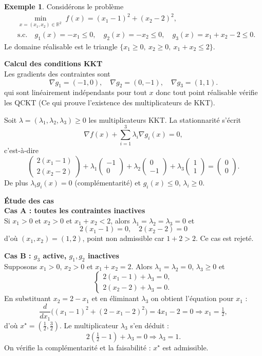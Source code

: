 \documentclass[a4paper,12pt,openany]{book}
\theoremstyle{plain}
\theoremstyle{definition}
\newtheorem{example}[theorem]{Exemple}
\theoremstyle{remark}
\theoremstyle{nbstyle}
\begin{document}
	\begin{example}
		Considérons le problème
		\[\begin{aligned}
		&\displaystyle\min_{x=(x_1,x_2)\in\mathbb{R}^2}\; f(x)=(x_1-1)^2+(x_2-2)^2,\\[4pt]
		&\text{s.c.}\quad g_1(x)=-x_1\le0,\quad g_2(x)=-x_2\le0,\quad g_3(x)=x_1+x_2-2\le0.
		\end{aligned}\]
		Le domaine réalisable est le triangle $\{x_1\ge0,\ x_2\ge0,\ x_1+x_2\le2\}$.
		
		\textbf{Calcul des conditions KKT}\\
		Les gradients des contraintes sont
		\[\nabla g_1=(-1,0),\quad \nabla g_2=(0,-1),\quad \nabla g_3=(1,1).
		\]
		qui sont linéairement indépendants pour tout $ x $ donc tout point réalisable vérifie les QCKT (Ce qui prouve l'existence des multiplicateurs de KKT).
		
		Soit $\lambda=(\lambda_1,\lambda_2,\lambda_3)\ge0$ les multiplicateurs KKT. La stationnarit\'e s'\'ecrit
		\[
		\nabla f(x)+\sum_{i=1}^3\lambda_i\nabla g_i(x)=0,
		\]
		c'est-\`a-dire
		\[\begin{pmatrix}2(x_1-1)\\[4pt]2(x_2-2)\end{pmatrix}
		+\lambda_1\begin{pmatrix}-1\\0\end{pmatrix}+\lambda_2\begin{pmatrix}0\\-1\end{pmatrix}+\lambda_3\begin{pmatrix}1\\1\end{pmatrix}=\begin{pmatrix}0\\0\end{pmatrix}.
		\]
		De plus $\lambda_i g_i(x)=0$ (compl\'ementarit\'e) et $g_i(x)\le0$, $\lambda_i\ge0$.
		
		\textbf{Étude des cas}\\
		
		\textbf{Cas A : toutes les contraintes inactives}\\
		Si $x_1>0$ et $x_2>0$ et $x_1+x_2<2$, alors $\lambda_1=\lambda_2=\lambda_3=0$ et
		\[2(x_1-1)=0,\quad 2(x_2-2)=0\]
		d'o\`u $(x_1,x_2)=(1,2)$, point non admissible car $1+2>2$. Ce cas est rejet\'e.
		
		\textbf{Cas B : $g_3$ active, $g_1,g_2$ inactives}\\
		Supposons $x_1>0$, $x_2>0$ et $x_1+x_2=2$. Alors $\lambda_1=\lambda_2=0$, $\lambda_3\ge0$ et
		\[\begin{cases}
		2(x_1-1)+\lambda_3=0,\\[4pt]
		2(x_2-2)+\lambda_3=0.
		\end{cases}\]
		En substituant $x_2=2-x_1$ et en éliminant $\lambda_3$ on obtient l'\'equation pour $x_1$ :
		\[\frac{d}{dx_1}\bigl((x_1-1)^2+(2-x_1-2)^2\bigr)=4x_1-2=0\Longrightarrow x_1=\tfrac12,
		\]
		d'o\`u $x^\star=(\tfrac12,\tfrac32)$. Le multiplicateur $\lambda_3$ s'en d\'eduit :
		\[2(\tfrac12-1)+\lambda_3=0\Longrightarrow \lambda_3=1.
		\]
		On v\'erifie la compl\'ementarit\'e et la faisabilit\'e : $x^\star$ est admissible.
		

\end{example}
\end{document}
